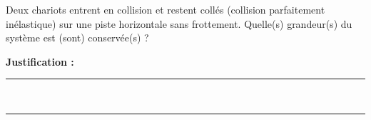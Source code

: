 Deux chariots entrent en collision et restent collés (collision parfaitement inélastique) sur une piste horizontale sans frottement. Quelle(s) grandeur(s) du système est (sont) conservée(s) ?

\choices

\noindent\textbf{Justification :} \hrulefill \\[2.5ex]
\rule{\linewidth}{0.4pt} \\[2.5ex]
\rule{\linewidth}{0.4pt}
\vfill
